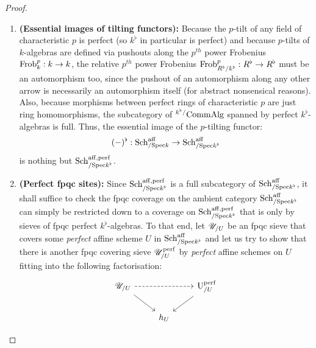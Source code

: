                         \begin{proof}
                            \noindent
                            \begin{enumerate}
                                \item \textbf{(Essential images of tilting functors):} Because the $p$-tilt of any field of characteristic $p$ is perfect (so $k^{\flat}$ in particular is perfect) and because $p$-tilts of $k$-algebras are defined via pushouts along the $p^{th}$ power Frobenius $\mathrm{Frob}_k^p: k \to k$, the relative $p^{th}$ power Frobenius $\mathrm{Frob}^p_{R^{\flat}/k^{\flat}}: R^{\flat} \to R^{\flat}$ must be an automorphism too, since the pushout of an automorphism along any other arrow is necessarily an automorphism itself (for abstract nonsensical reasons). Also, because morphisms between perfect rings of characteristic $p$ are just ring homomorphisms, the subcategory of ${}^{k^{\flat}/}\mathrm{Comm}\mathrm{Alg}$ spanned by perfect $k^{\flat}$-algebras is full. Thus, the essential image of the $p$-tilting functor:
                                    $$(-)^{\flat}: \mathrm{Sch}^{\mathrm{aff}}_{/\mathrm{Spec} k} \to \mathrm{Sch}^{\mathrm{aff}}_{/\mathrm{Spec} k^{\flat}}$$
                                is nothing but $\mathrm{Sch}^{\mathrm{aff}, \mathrm{perf}}_{/\mathrm{Spec} k^{\flat}}$.
                                \item \textbf{(Perfect fpqc sites):} Since $\mathrm{Sch}^{\mathrm{aff}, \mathrm{perf}}_{/\mathrm{Spec} k^{\flat}}$ is a full subcategory of $\mathrm{Sch}^{\mathrm{aff}}_{/\mathrm{Spec} k^{\flat}}$, it shall suffice to check the fpqc coverage on the ambient category $\mathrm{Sch}^{\mathrm{aff}}_{/\mathrm{Spec} k^{\flat}}$ can simply be restricted down to a coverage on $\mathrm{Sch}^{\mathrm{aff}, \mathrm{perf}}_{/\mathrm{Spec} k^{\flat}}$ that is only by sieves of fpqc perfect $k^{\flat}$-algebras. To that end, let $\mathscr{U}_{/U}$ be an fpqc sieve that covers some \textit{perfect} affine scheme $U$ in $\mathrm{Sch}^{\mathrm{aff}}_{/\mathrm{Spec} k^{\flat}}$ and let us try to show that there is another fpqc covering sieve $\mathscr{U}_{/U}^{\mathrm{perf}}$ by \textit{perfect} affine schemes on $U$ fitting into the following factorisation:
                                    $$
                                        \begin{tikzcd}
                                        	\scrU_{/U} && {\U^{\perf}_{/U}} \\
                                        	& h_U
                                        	\arrow[from=1-1, to=2-2]
                                        	\arrow[from=1-3, to=2-2]
                                        	\arrow[dashed, from=1-1, to=1-3]
                                        \end{tikzcd}
$$
\end{enumerate}
\end{proof}
